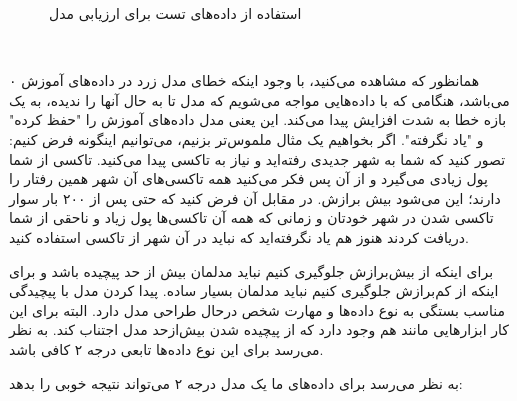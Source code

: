\documentclass[a4paper, titlepage]{article}
\begin{document}
\begin{figure}[!htp]
    \caption{استفاده از داده‌های تست برای ارزیابی مدل}
    \label{overfittingUnderfitting}
    \end{figure}

    \begin{center}
         \\
    \end{center}

\color{black}

همانظور که مشاهده می‌کنید، با وجود اینکه خطای مدل زرد در داده‌های آموزش ۰ می‌باشد، هنگامی که با داده‌هایی مواجه می‌شویم که مدل تا به حال آنها را ندیده، به یک بازه خطا به شدت افزایش پیدا می‌کند. این یعنی مدل داده‌های آموزش را "حفظ کرده" و "یاد نگرفته". اگر بخواهیم یک مثال ملموس‌تر بزنیم، می‌توانیم اینگونه فرض کنیم: تصور کنید که شما به شهر جدیدی رفته‌اید و نیاز به تاکسی پیدا می‌کنید. تاکسی از شما پول زیادی می‌گیرد و از آن پس فکر می‌کنید همه تاکسی‌های آن شهر همین رفتار را دارند؛ این می‌شود بیش برازش. در مقابل آن فرض کنید که حتی پس از ۲۰۰ بار سوار تاکسی شدن در شهر خودتان و زمانی که همه آن تاکسی‌ها پول زیاد و ناحقی از شما دریافت کردند هنوز هم یاد نگرفته‌اید که نباید در آن شهر از تاکسی استفاده کنید.

برای اینکه از بیش‌برازش جلوگیری کنیم نباید مدلمان بیش از حد پیچیده باشد و برای اینکه از کم‌برازش جلوگیری کنیم نباید مدلمان بسیار ساده. پیدا کردن مدل با پیچیدگی مناسب بستگی به نوع داده‌ها و مهارت شخص درحال طراحی مدل دارد. البته برای این کار ابزار‌هایی مانند  هم وجود دارد که از پیچیده شدن بیش‌از‌حد مدل اجتناب کند. به نظر می‌رسد برای این نوع داده‌ها تابعی درجه ۲ کافی باشد.

به نظر می‌رسد برای داده‌های ما یک مدل درجه ۲ می‌تواند نتیجه خوبی را بدهد:
\end{document}

